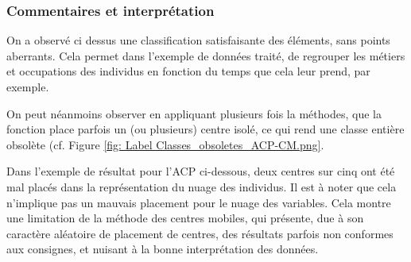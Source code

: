 \subsubsection{Commentaires et interprétation}


On a observé ci dessus une classification satisfaisante des éléments, sans points aberrants. Cela permet dans l'exemple de données traité, de regrouper les métiers et occupations des individus en fonction du temps que cela leur prend, par exemple.

On peut néanmoins observer en appliquant plusieurs fois la méthodes, que la fonction place parfois un (ou plusieurs) centre isolé, ce qui rend une classe entière obsolète (cf. Figure \ref{fig: Label Classes_obsoletes_ACP-CM.png}.


Dans l'exemple de résultat pour l'ACP ci-dessous, deux centres sur cinq ont été mal placés dans la représentation du nuage des individus. Il est à noter que cela n'implique pas un mauvais placement pour le nuage des variables. Cela montre une limitation de la méthode des centres mobiles, qui présente, due à son caractère aléatoire de placement de centres, des résultats parfois non conformes aux consignes, et nuisant à la bonne interprétation des données.

